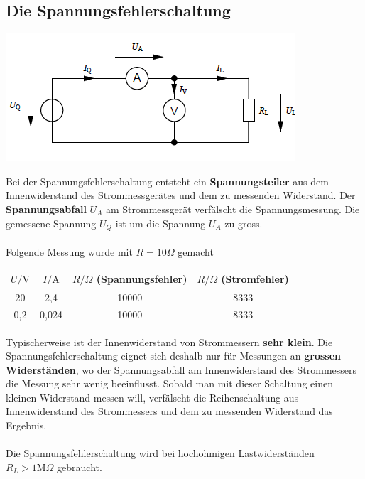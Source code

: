 \subsection{Die Spannungsfehlerschaltung}
\begin{center}
\includegraphics[scale=1]{../img/II/IId}
\end{center}
Bei der Spannungsfehlerschaltung entsteht ein \textbf{Spannungsteiler} aus dem Innenwiderstand des Strommessgerätes und dem zu messenden Widerstand. Der \textbf{Spannungsabfall} $U_A$ am Strommessgerät verfälscht die Spannungsmessung. Die gemessene Spannung $U_Q$ ist um die Spannung $U_A$ zu gross.
\\\\
Folgende Messung wurde mit $R=10\Omega$ gemacht
\begin{center}
\begin{tabular}{cccc}\hline
$U/\text{V}$&$I/\text{A}$&$R/\Omega$ (Spannungsfehler)&$R/\Omega$ (Stromfehler)\\\hline
20&2,4&10000&8333\\
0,2&0,024&10000&8333\\\hline
\end{tabular}
\end{center}
Typischerweise ist der Innenwiderstand von Strommessern \textbf{sehr klein}. Die Spannungsfehlerschaltung eignet sich deshalb nur für Messungen an \textbf{grossen Widerständen}, wo der Spannungsabfall am Innenwiderstand des Strommessers die Messung sehr wenig beeinflusst. Sobald man mit dieser Schaltung einen kleinen Widerstand messen will, verfälscht die Reihenschaltung aus Innenwiderstand des Strommessers und dem zu messenden Widerstand das Ergebnis.
\\\\
Die Spannungsfehlerschaltung wird bei hochohmigen Lastwiderständen $\boxed{R_L>1\text{M}\Omega}$ gebraucht.
